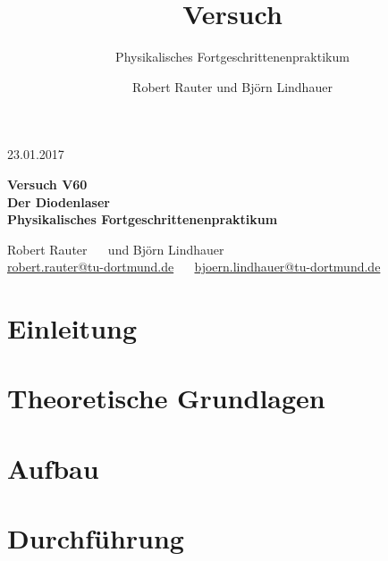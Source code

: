 \documentclass[captions=tableheading]{scrartcl}
\title{Versuch \versuchnummer\\ \versuchname}
\subtitle{Physikalisches Fortgeschrittenenpraktikum}
\author{Robert Rauter und Björn Lindhauer}
\date{\versuchdatum}
\newcommand{\versuchnummer}{V60}
\newcommand{\versuchname}{Der Diodenlaser}
\newcommand{\versuchdatum}{23.01.2017}
\begin{document}
\begin{titlepage}
{\large \versuchdatum}
\vspace{7cm}
\begin{center}
\textbf{\huge Versuch \versuchnummer}\\\vspace{0.5cm}
\textbf{\huge \versuchname}\\
\vspace{0.2cm}
\textbf{Physikalisches Fortgeschrittenenpraktikum}\\
\vspace{9cm}

{\Large Robert Rauter \ \ \hspace{1.5cm} und \hspace{1.5cm} Björn Lindhauer}\\
{ \url{robert.rauter@tu-dortmund.de} \ \ \hspace{2cm} \url{bjoern.lindhauer@tu-dortmund.de}}
\end{center}
\end{titlepage}
\section{Einleitung}

\section{Theoretische Grundlagen}

\section{Aufbau}

\section{Durchführung}
\end{document}
